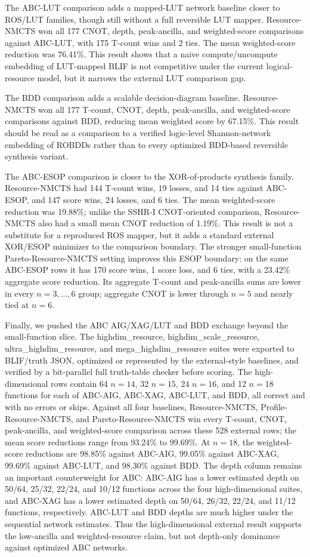 \documentclass[11pt]{article}
\newcommand{\method}{Resource-NMCTS}
\newcommand{\profilemethod}{Profile-Resource-NMCTS}
\newcommand{\paretomethod}{Pareto-Resource-NMCTS}
\newcommand{\highdimdataset}{highdim\_resource}
\newcommand{\scaledataset}{highdim\_scale\_resource}
\newcommand{\ultradataset}{ultra\_highdim\_resource}
\newcommand{\megadataset}{mega\_highdim\_resource}
\begin{document}
The ABC-LUT comparison adds a mapped-LUT network baseline closer to ROS/LUT
families, though still without a full reversible LUT mapper.  \method{} won all
177 CNOT, depth, peak-ancilla, and weighted-score comparisons against ABC-LUT,
with 175 T-count wins and 2 ties.  The mean weighted-score reduction was
76.41\%.  This result shows that a naive compute/uncompute embedding of
LUT-mapped BLIF is not competitive under the current logical-resource model,
but it narrows the external LUT comparison gap.

The BDD comparison adds a scalable decision-diagram baseline.  \method{} won
all 177 T-count, CNOT, depth, peak-ancilla, and weighted-score comparisons
against BDD, reducing mean weighted score by 67.15\%.  This result should be
read as a comparison to a verified logic-level Shannon-network embedding of
ROBDDs rather than to every optimized BDD-based reversible synthesis variant.

The ABC-ESOP comparison is closer to the XOR-of-products synthesis family.
\method{} had 144 T-count wins, 19 losses, and 14 ties against ABC-ESOP, and
147 score wins, 24 losses, and 6 ties.  The mean weighted-score reduction was
19.88\%; unlike the SSHR-I CNOT-oriented comparison, \method{} also had a small
mean CNOT reduction of 1.19\%.  This result is not a substitute for a reproduced
ROS mapper, but it adds a standard external XOR/ESOP minimizer to the
comparison boundary.
The stronger small-function \paretomethod{} setting improves this ESOP boundary:
on the same ABC-ESOP rows it has 170 score wins, 1 score loss, and 6 ties, with
a 23.42\% aggregate score reduction.  Its aggregate T-count and peak-ancilla
sums are lower in every $n=3,\ldots,6$ group; aggregate CNOT is lower through
$n=5$ and nearly tied at $n=6$.

Finally, we pushed the ABC AIG/XAG/LUT and BDD exchange beyond the small-function
slice.  The \highdimdataset{}, \scaledataset{}, \ultradataset{}, and
\megadataset{} suites were
exported to BLIF/truth JSON, optimized or represented by the external-style
baselines, and verified by a bit-parallel full truth-table checker before
scoring.  The high-dimensional rows contain 64 $n=14$, 32 $n=15$, 24 $n=16$,
and 12 $n=18$ functions for each of ABC-AIG, ABC-XAG, ABC-LUT, and BDD, all
correct and with no errors or skips.  Against all four baselines, \method{},
\profilemethod{}, and \paretomethod{} win every T-count, CNOT, peak-ancilla,
and weighted-score comparison across these 528 external rows; the mean
score reductions range from 93.24\% to 99.69\%.  At $n=18$, the weighted-score
reductions are
98.85\% against ABC-AIG, 99.05\% against ABC-XAG, 99.69\% against ABC-LUT, and
98.30\% against BDD.  The depth column remains an important counterweight for
ABC: ABC-AIG has a lower estimated depth on 50/64, 25/32, 22/24, and 10/12
functions across the four high-dimensional suites, and ABC-XAG has a lower
estimated depth on 50/64, 26/32, 22/24, and 11/12 functions, respectively.
ABC-LUT and BDD
depths are much higher under the sequential network estimates.  Thus the
high-dimensional external result supports the low-ancilla and weighted-resource
claim, but not depth-only dominance against optimized ABC networks.
\end{document}
